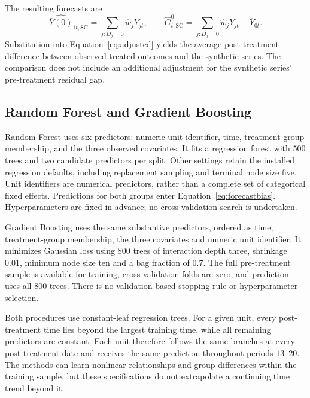 \documentclass[11pt,a4paper]{article}
\begin{document}
The resulting forecasts are
\begin{equation}\label{eq:synthprediction}
\widehat{\overline Y(0)}_{1t,\mathrm{SC}}=\sum_{j:D_j=0}\widehat w_jY_{jt},
\qquad \widehat G^0_{t,\mathrm{SC}}=\sum_{j:D_j=0}\widehat w_jY_{jt}-\overline Y_{0t}.
\end{equation}
Substitution into Equation~\ref{eq:adjusted} yields the average post-treatment difference between observed treated outcomes and the synthetic series. The comparison does not include an additional adjustment for the synthetic series' pre-treatment residual gap.

\subsection{Random Forest and Gradient Boosting}
Random Forest uses six predictors: numeric unit identifier, time, treatment-group membership, and the three observed covariates. It fits a regression forest with 500 trees and two candidate predictors per split. Other settings retain the installed regression defaults, including replacement sampling and terminal node size five. Unit identifiers are numerical predictors, rather than a complete set of categorical fixed effects. Predictions for both groups enter Equation~\ref{eq:forecastbias}. Hyperparameters are fixed in advance; no cross-validation search is undertaken.

Gradient Boosting uses the same substantive predictors, ordered as time, treatment-group membership, the three covariates and numeric unit identifier. It minimizes Gaussian loss using 800 trees of interaction depth three, shrinkage 0.01, minimum node size ten and a bag fraction of 0.7. The full pre-treatment sample is available for training, cross-validation folds are zero, and prediction uses all 800 trees. There is no validation-based stopping rule or hyperparameter selection.

Both procedures use constant-leaf regression trees. For a given unit, every post-treatment time lies beyond the largest training time, while all remaining predictors are constant. Each unit therefore follows the same branches at every post-treatment date and receives the same prediction throughout periods $13$--$20$. The methods can learn nonlinear relationships and group differences within the training sample, but these specifications do not extrapolate a continuing time trend beyond it.
\end{document}
